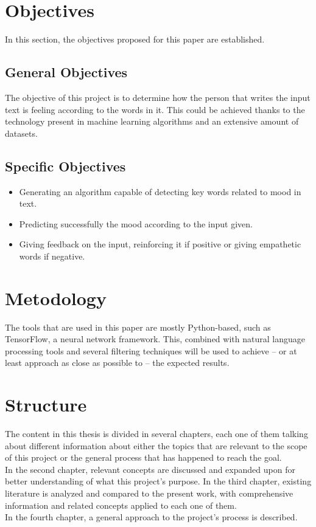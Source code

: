 \section{Objectives}
In this section, the objectives proposed for this paper are established.

\subsection{General Objectives}
The objective of this project is to determine how the person that writes the input text is feeling according to the words in it. This could be achieved thanks to the technology present in machine learning algorithms and an extensive amount of datasets.

\subsection{Specific Objectives}
\begin{itemize}
	\item Generating an algorithm capable of detecting key words related to mood in text.
	\item Predicting successfully the mood according to the input given.
	\item Giving feedback on the input, reinforcing it if positive or giving empathetic words if negative.
\end{itemize}

\section{Metodology}
The tools that are used in this paper are mostly Python-based, such as TensorFlow, a neural network framework. This, combined with natural language processing tools and several filtering techniques will be used to achieve -- or at least approach as close as possible to -- the expected results.

\section{Structure}
The content in this thesis is divided in several chapters, each one of them talking about different information about either the topics that are relevant to the scope of this project or the general process that has happened to reach the goal.\\
In the second chapter, relevant concepts are discussed and expanded upon for better understanding of what this project's purpose.
In the third chapter, existing literature is analyzed and compared to the present work, with comprehensive information and related concepts applied to each one of them.\\
In the fourth chapter, a general approach to the project's process is described.
\clearpage